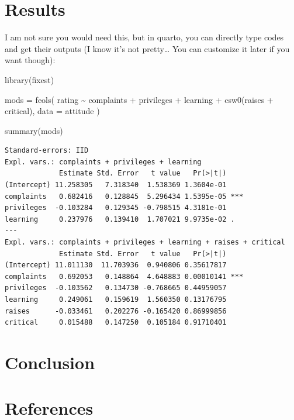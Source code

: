 \documentclass[
  11pt]{article}
\newenvironment{Shaded}{\begin{snugshade}}{\end{snugshade}}
\newcommand{\AttributeTok}[1]{\textcolor[rgb]{0.40,0.45,0.13}{#1}}
\newcommand{\FunctionTok}[1]{\textcolor[rgb]{0.28,0.35,0.67}{#1}}
\newcommand{\NormalTok}[1]{\textcolor[rgb]{0.00,0.23,0.31}{#1}}
\newcommand{\OtherTok}[1]{\textcolor[rgb]{0.00,0.23,0.31}{#1}}
\newcommand{\SpecialCharTok}[1]{\textcolor[rgb]{0.37,0.37,0.37}{#1}}
\begin{document}
\section{Results}\label{sec-result}

I am not sure you would need this, but in quarto, you can directly type
codes and get their outputs (I know it's not pretty\ldots{} You can
customize it later if you want though):

\begin{Shaded}
\begin{Highlighting}[]
\FunctionTok{library}\NormalTok{(fixest)}

\NormalTok{mods }\OtherTok{=} \FunctionTok{feols}\NormalTok{(}
\NormalTok{  rating }\SpecialCharTok{\textasciitilde{}}\NormalTok{ complaints }\SpecialCharTok{+}\NormalTok{ privileges }\SpecialCharTok{+}\NormalTok{ learning }\SpecialCharTok{+} \FunctionTok{csw0}\NormalTok{(raises }\SpecialCharTok{+}\NormalTok{ critical),}
  \AttributeTok{data =}\NormalTok{ attitude}
\NormalTok{)}

\FunctionTok{summary}\NormalTok{(mods)}
\end{Highlighting}
\end{Shaded}

\begin{verbatim}
Standard-errors: IID 
Expl. vars.: complaints + privileges + learning
             Estimate Std. Error   t value   Pr(>|t|)    
(Intercept) 11.258305   7.318340  1.538369 1.3604e-01    
complaints   0.682416   0.128845  5.296434 1.5395e-05 ***
privileges  -0.103284   0.129345 -0.798515 4.3181e-01    
learning     0.237976   0.139410  1.707021 9.9735e-02 .  
---
Expl. vars.: complaints + privileges + learning + raises + critical
             Estimate Std. Error   t value   Pr(>|t|)    
(Intercept) 11.011130  11.703936  0.940806 0.35617817    
complaints   0.692053   0.148864  4.648883 0.00010141 ***
privileges  -0.103562   0.134730 -0.768665 0.44959057    
learning     0.249061   0.159619  1.560350 0.13176795    
raises      -0.033461   0.202276 -0.165420 0.86999856    
critical     0.015488   0.147250  0.105184 0.91710401    
\end{verbatim}

\section{Conclusion}\label{sec-conc}

\section*{References}\label{references}
\end{document}

